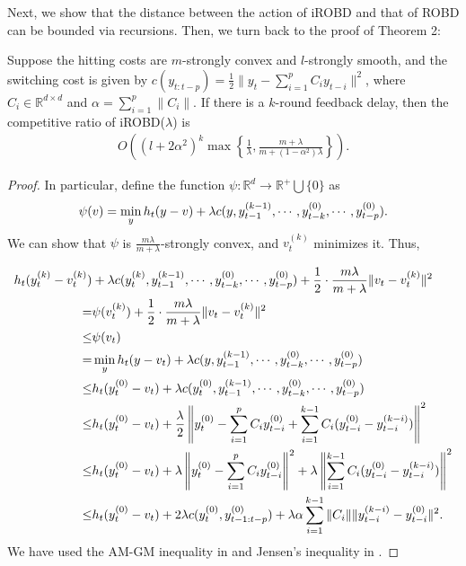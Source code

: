 Next, we show that the distance between the action of iROBD and that of ROBD can be bounded via recursions. Then, we turn back to the proof of Theorem 2:

\begin{theorem*}
Suppose the hitting costs are $m$-strongly convex and $l$-strongly smooth, and the switching cost is given by $c(y_{t:t-p})=\frac{1}{2}\|y_t-\sum_{i=1}^pC_iy_{t-i}\|^2$, where $C_i\in\mathbb{R}^{d\times d}$ and $\alpha=\sum_{i=1}^p\|C_i\|$. If there is a $k$-round feedback delay, then the competitive ratio of iROBD($\lambda$) is
\begin{align}
    O\left( (l+2\alpha^2)^k\max\left\{\frac{1}{\lambda},\frac{m+\lambda}{m+(1-\alpha^2)\lambda}\right\} \right).
\end{align}
\end{theorem*}
\begin{proof}

In particular, define the function $\psi:\mathbb{R}^d\to\mathbb{R}^{+}\bigcup\{0\}$ as
\begin{align}
    \psi(v)=\min_yh_t(y-v)+\lambda c(y,y_{t-1}^{(k-1)},\cdots,y_{t-k}^{(0)},\cdots,y_{t-p}^{(0)}).\notag
\end{align}
We can show that $\psi$ is $\frac{m\lambda}{m+\lambda}$-strongly convex, and $v_t^{(k)}$ minimizes it. Thus,

\begin{subequations}\label{appendix.a.1}
\begin{align}
    h_t(y_t^{(k)}-v_t^{(k)})&+\lambda c(y_t^{(k)},y_{t-1}^{(k-1)},\cdots,y_{t-k}^{(0)},\cdots,y_{t-p}^{(0)})+\frac{1}{2}\cdot\frac{m\lambda}{m+\lambda}\|v_t-v_t^{(k)}\|^2\notag\\
    =&\psi(v_t^{(k)})+\frac{1}{2}\cdot\frac{m\lambda}{m+\lambda}\|v_t-v_t^{(k)}\|^2\notag\\
    \le&\psi(v_t)\notag\\
    =&\min_yh_t(y-v_t)+\lambda c(y,y_{t-1}^{(k-1)},\cdots,y_{t-k}^{(0)},\cdots,y_{t-p}^{(0)})\notag\\
    \le&h_t(y_t^{(0)}-v_t)+\lambda c(y_t^{(0)},y_{t-1}^{(k-1)},\cdots,y_{t-k}^{(0)},\cdots,y_{t-p}^{(0)})\notag\\
    \le&h_t(y_t^{(0)}-v_t)+\frac{\lambda}{2}\left\|y_t^{(0)}-\sum_{i=1}^pC_iy_{t-i}^{(0)}+\sum_{i=1}^{k-1}C_i(y_{t-i}^{(0)}-y_{t-i}^{(k-i)})\right\|^2\notag\\
    \le&h_t(y_t^{(0)}-v_t)+\lambda\left\|y_t^{(0)}-\sum_{i=1}^pC_iy_{t-i}^{(0)}\right\|^2+\lambda\left\|\sum_{i=1}^{k-1}C_i(y_{t-i}^{(0)}-y_{t-i}^{(k-i)})\right\|^2\label{a.a.e.2.1}\\
    \le&h_t(y_t^{(0)}-v_t)+2\lambda c(y_t^{(0)},y_{t-1:t-p}^{(0)})+\lambda\alpha\sum_{i=1}^{k-1}\|C_i\|\|y_{t-i}^{(k-i)}-y_{t-i}^{(0)}\|^2.\label{a.a.e.2.2}
\end{align}
\end{subequations}
We have used the AM-GM inequality in  and Jensen's inequality in . %





\end{proof}
